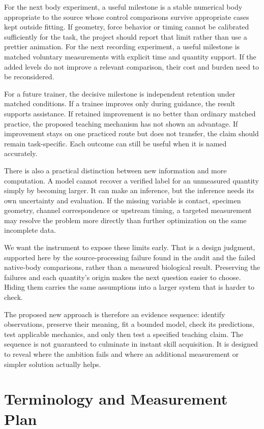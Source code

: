 For the next body experiment, a useful milestone is a stable numerical body appropriate to the source whose control comparisons survive appropriate cases kept outside fitting. If geometry, force behavior or timing cannot be calibrated sufficiently for the task, the project should report that limit rather than use a prettier animation. For the next recording experiment, a useful milestone is matched voluntary measurements with explicit time and quantity support. If the added levels do not improve a relevant comparison, their cost and burden need to be reconsidered.

For a future trainer, the decisive milestone is independent retention under matched conditions. If a trainee improves only during guidance, the result supports assistance. If retained improvement is no better than ordinary matched practice, the proposed teaching mechanism has not shown an advantage. If improvement stays on one practiced route but does not transfer, the claim should remain task-specific. Each outcome can still be useful when it is named accurately.

There is also a practical distinction between new information and more computation. A model cannot recover a verified label for an unmeasured quantity simply by becoming larger. It can make an inference, but the inference needs its own uncertainty and evaluation. If the missing variable is contact, specimen geometry, channel correspondence or upstream timing, a targeted measurement may resolve the problem more directly than further optimization on the same incomplete data.

We want the instrument to expose these limits early. That is a design judgment, supported here by the source-processing failure found in the audit and the failed native-body comparisons, rather than a measured biological result. Preserving the failures and each quantity's origin makes the next question easier to choose. Hiding them carries the same assumptions into a larger system that is harder to check.

The proposed new approach is therefore an evidence sequence: identify observations, preserve their meaning, fit a bounded model, check its predictions, test applicable mechanics, and only then test a specified teaching claim. The sequence is not guaranteed to culminate in instant skill acquisition. It is designed to reveal where the ambition fails and where an additional measurement or simpler solution actually helps.



\section{Terminology and Measurement Plan}

